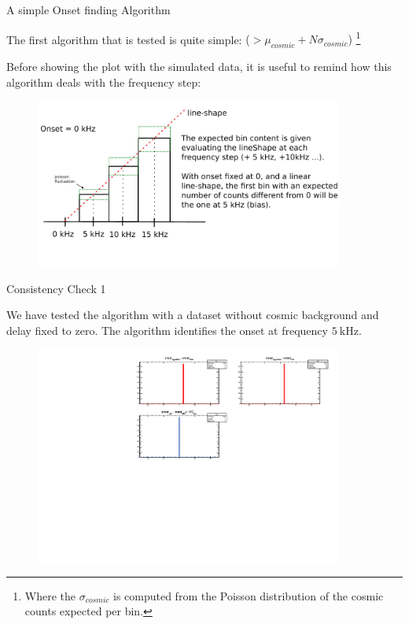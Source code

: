 \documentclass[9pt]{beamer}
\begin{document}
\begin{frame}{A simple Onset finding Algorithm}

The first algorithm that is tested is quite simple: { ($> \mu_{cosmic} + N \sigma_{cosmic}$)} \footnote{Where the $\sigma_{cosmic}$ is computed from the Poisson distribution of the cosmic counts expected per bin.}

Before showing the plot with the simulated data, it is useful to remind how this algorithm deals with the frequency step:

\begin{figure}
\includegraphics[width = 0.9\textwidth]{ExplainingAlgorithm1.pdf}
\end{figure}
\end{frame}

\begin{frame}{Consistency Check 1}

We have tested the algorithm with a dataset without cosmic background and delay fixed to zero. The algorithm identifies the onset at frequency $\SI{5}{\kilo \hertz}$.

\begin{figure}
\includegraphics[width = 0.9\textwidth]{../Plot/OnsetResult.pdf}
\end{figure} 
\end{frame}
\end{document}
